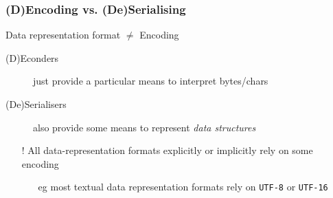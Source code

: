 \documentclass{beamer}\mode<presentation>{\usetheme{AMSBolognaFC}}
\begin{document}
\begin{frame}[allowframebreaks]
\frametitle{(D)Encoding vs. (De)Serialising}

    \begin{block}{Data representation format $\neq$ Encoding}
        \begin{description}
            \item[(D)Econders] just provide a particular means to interpret bytes/chars
            \item[(De)Serialisers] also provide some means to represent \emph{data structures}
        \end{description}
        \begin{itemize}
            \item[!] All data-representation formats explicitly or implicitly rely on some encoding
            \begin{itemize}
                \item[eg] most textual data representation formats rely on \texttt{UTF-8} or \texttt{UTF-16}
            \end{itemize}
        \end{itemize}
    \end{block}

\end{frame}
\end{document}
